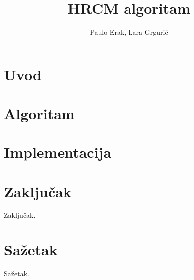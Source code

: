 \documentclass[times, utf8, seminar]{fer}
\begin{document}
\title{HRCM algoritam}

\author{Paulo Erak, Lara Grgurić}


\maketitle

\tableofcontents

\chapter{Uvod}


\chapter{Algoritam}


\chapter{Implementacija}


\chapter{Zaključak}
Zaključak.




\chapter{Sažetak}
Sažetak.
\end{document}
